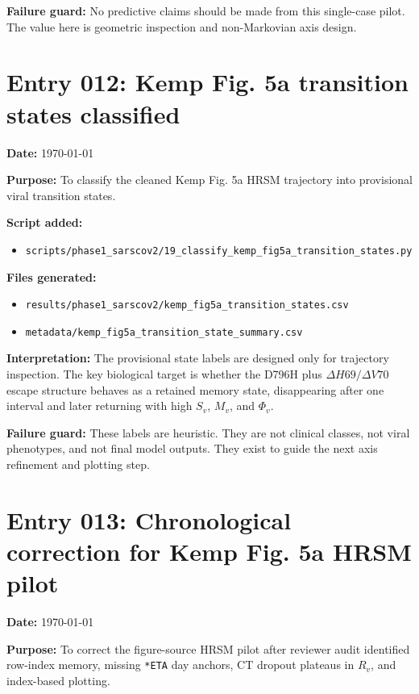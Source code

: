 \textbf{Failure guard:} No predictive claims should be made from this single-case pilot. The value here is geometric inspection and non-Markovian axis design.


\section*{Entry 012: Kemp Fig. 5a transition states classified}

\textbf{Date:} \today

\textbf{Purpose:} To classify the cleaned Kemp Fig. 5a HRSM trajectory into provisional viral transition states.

\textbf{Script added:}
\begin{itemize}
    \item \texttt{scripts/phase1\_sarscov2/19\_classify\_kemp\_fig5a\_transition\_states.py}
\end{itemize}

\textbf{Files generated:}
\begin{itemize}
    \item \texttt{results/phase1\_sarscov2/kemp\_fig5a\_transition\_states.csv}
    \item \texttt{metadata/kemp\_fig5a\_transition\_state\_summary.csv}
\end{itemize}

\textbf{Interpretation:} The provisional state labels are designed only for trajectory inspection. The key biological target is whether the D796H plus \(\Delta H69/\Delta V70\) escape structure behaves as a retained memory state, disappearing after one interval and later returning with high \(S_v\), \(M_v\), and \(\Phi_v\).

\textbf{Failure guard:} These labels are heuristic. They are not clinical classes, not viral phenotypes, and not final model outputs. They exist to guide the next axis refinement and plotting step.


\section*{Entry 013: Chronological correction for Kemp Fig. 5a HRSM pilot}

\textbf{Date:} \today

\textbf{Purpose:} To correct the figure-source HRSM pilot after reviewer audit identified row-index memory, missing \texttt{*ETA} day anchors, CT dropout plateaus in \(R_v\), and index-based plotting.

